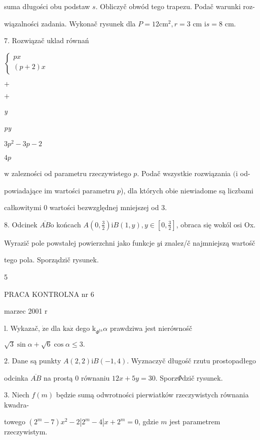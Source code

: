 \documentclass[a4paper,12pt]{article}
\begin{document}
suma długości obu podstaw $s$. Obliczyč obwód tego trapezu. Podač warunki roz-

wiązalności zadania. Wykonač rysunek dla $P=12\mathrm{c}\mathrm{m}^{2}, r=3$ cm $\mathrm{i}s=8$ cm.

7. Rozwiązač uklad równań

$\left\{\begin{array}{l}
px\\
(p+2)x
\end{array}\right.$

$+$

$+$

{\it y}

{\it py}

$3p^{2}-3p-2$

$4p$

$\mathrm{w}$ zalezności od parametru rzeczywistego $p$. Podač wszystkie rozwiązania $(\mathrm{i}$ od-

powiadające im wartości parametru $p$), dla których obie niewiadome są liczbami

całkowitymi $0$ wartości bezwzględnej mniejszej od 3.

8. Odcinek $\overline{AB}\mathrm{o}$ końcach $A(0,\displaystyle \frac{3}{2}) \mathrm{i} B(1,y), y \in [0,\displaystyle \frac{3}{2}]$, obraca się wokól osi Ox.

Wyrazič pole powstałej powierzchni jako funkcje $y\mathrm{i}$ znalez/č najmniejszą wartośč

tego pola. Sporządzič rysunek.

5





PRACA KONTROLNA nr 6

marzec 2001 r

l. Wykazač, $\dot{\mathrm{z}}\mathrm{e}$ dla $\mathrm{k}\mathrm{a}\dot{\mathrm{z}}$ dego $\mathrm{k}_{\Phi^{\mathrm{t}\mathrm{a}}} \alpha$ prawdziwa jest nierównośč

$\sqrt{3}\sin\alpha+\sqrt{6}\cos\alpha\leq 3.$

2. Dane są punkty $A(2,2) \mathrm{i} B(-1,4)$. Wyznaczyč długośč rzutu prostopadłego

odcinka $\overline{AB}$ na prostą $0$ równaniu $12x+5y=30$. Sporz$\Phi$dzič rysunek.

3. Niech $f(m)$ będzie sumą odwrotności pierwiatków rzeczywistych równania kwadra-

towego $(2^{m}-7)x^{2}-2|2^{m}-4|x+2^{m}=0$, gdzie $m$ jest parametrem rzeczywistym.
\end{document}
